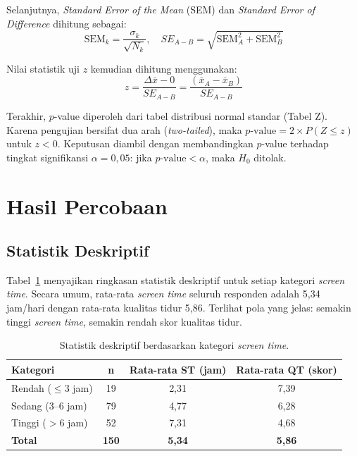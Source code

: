 \documentclass[metlit,article,accept,pdftex,moreauthors]{Definitions/mdpi}
\begin{document}
Selanjutnya, \textit{Standard Error of the Mean} (SEM) dan \textit{Standard Error of Difference} dihitung sebagai:
\begin{equation}
\label{eq:sem}
\text{SEM}_k = \frac{\sigma_k}{\sqrt{N_k}}, \quad SE_{A-B} = \sqrt{\text{SEM}_A^2 + \text{SEM}_B^2}
\end{equation}

Nilai statistik uji $z$ kemudian dihitung menggunakan:
\begin{equation}
\label{eq:ztest}
z = \frac{\Delta\bar{x} - 0}{SE_{A-B}} = \frac{(\bar{x}_A - \bar{x}_B)}{SE_{A-B}}
\end{equation}

Terakhir, $p$-value diperoleh dari tabel distribusi normal standar (Tabel Z). Karena pengujian bersifat dua arah (\textit{two-tailed}), maka $p\text{-value} = 2 \times P(Z \leq z)$ untuk $z < 0$. Keputusan diambil dengan membandingkan $p$-value terhadap tingkat signifikansi $\alpha = 0{,}05$: jika $p\text{-value} < \alpha$, maka $H_0$ ditolak.

\section{Hasil Percobaan}

\subsection{Statistik Deskriptif}

Tabel~\ref{tab:deskriptif} menyajikan ringkasan statistik deskriptif untuk setiap kategori \textit{screen time}. Secara umum, rata-rata \textit{screen time} seluruh responden adalah 5,34 jam/hari dengan rata-rata kualitas tidur 5,86. Terlihat pola yang jelas: semakin tinggi \textit{screen time}, semakin rendah skor kualitas tidur.

\begin{table}[H]
\centering
\caption{Statistik deskriptif berdasarkan kategori \textit{screen time}.}
\label{tab:deskriptif}
\begin{tabular}{@{}lccc@{}}
\toprule
\textbf{Kategori} & \textbf{n} & \textbf{Rata-rata ST (jam)} & \textbf{Rata-rata QT (skor)} \\
\midrule
Rendah ($\leq$3 jam) & 19 & 2,31 & 7,39 \\
Sedang (3--6 jam) & 79 & 4,77 & 6,28 \\
Tinggi ({$>$}6 jam) & 52 & 7,31 & 4,68 \\
\midrule
\textbf{Total} & \textbf{150} & \textbf{5,34} & \textbf{5,86} \\
\bottomrule
\end{tabular}
\end{table}
\end{document}
